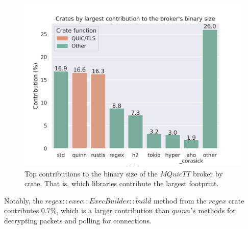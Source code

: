 \begin{figure}[ht]
    \centering
    \includegraphics[width=1\linewidth]{images/mquictt_binary_broker.png}
    \caption{Top contributions to the binary size of the $MQuicTT$ broker by crate. That is, which libraries contribute the largest footprint.}
    \label{fig:mquictt_broker_bin}
\end{figure}

Notably, the $regex::exec::ExecBuilder::build$ method from the $regex$ crate contributes $0.7\%$, which is a larger contribution than $quinn's$ methods for decrypting packets and polling for connections.

